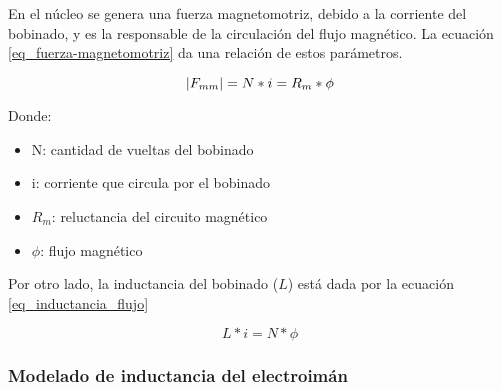 \noindent En el núcleo se genera una fuerza magnetomotriz, debido a la corriente del bobinado, y es la responsable de la circulación del flujo magnético. La ecuación \ref{eq_fuerza-magnetomotriz} da una relación de estos parámetros.	






\begin{equation} \label{eq_fuerza-magnetomotriz}
	\lvert F_{mm}\rvert=N*i=R_{m}*\phi	
\end{equation}

\noindent Donde: 
\begin{itemize}
	\item N: cantidad de vueltas del bobinado
	\item i: corriente que circula por el bobinado
	\item $R_{m}$: reluctancia del circuito magnético
	\item $\phi$: flujo magnético
\end{itemize}


\noindent Por otro lado, la inductancia del bobinado ($L$) está dada por la ecuación \ref{eq_inductancia_flujo}

\begin{equation} \label{eq_inductancia_flujo}
	L*i=N*\phi
\end{equation}

\subsubsection{Modelado de inductancia del electroimán}

